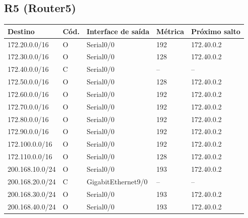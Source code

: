 \subsection*{R5 (Router5)}
\begin{tabular}{@{}llllp{3.6cm}@{}}\toprule Destino & Cód. & Interface de saída & Métrica & Próximo salto\\\midrule
172.20.0.0/16 & O & Serial0/0 & 192 & 172.40.0.2\\
172.30.0.0/16 & O & Serial0/0 & 128 & 172.40.0.2\\
172.40.0.0/16 & C & Serial0/0 & -- & --\\
172.50.0.0/16 & O & Serial0/0 & 128 & 172.40.0.2\\
172.60.0.0/16 & O & Serial0/0 & 192 & 172.40.0.2\\
172.70.0.0/16 & O & Serial0/0 & 192 & 172.40.0.2\\
172.80.0.0/16 & O & Serial0/0 & 192 & 172.40.0.2\\
172.90.0.0/16 & O & Serial0/0 & 192 & 172.40.0.2\\
172.100.0.0/16 & O & Serial0/0 & 192 & 172.40.0.2\\
172.110.0.0/16 & O & Serial0/0 & 128 & 172.40.0.2\\
200.168.10.0/24 & O & Serial0/0 & 193 & 172.40.0.2\\
200.168.20.0/24 & C & GigabitEthernet9/0 & -- & --\\
200.168.30.0/24 & O & Serial0/0 & 193 & 172.40.0.2\\
200.168.40.0/24 & O & Serial0/0 & 193 & 172.40.0.2\\
\bottomrule\end{tabular}

